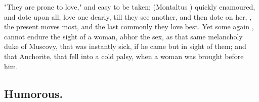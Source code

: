 {"They are prone to love," and easy to be taken;
 (Montaltus ) quickly enamoured, and dote upon all, love one dearly, till they see
another, and then dote on her, , the
present moves most, and the last commonly they love best. Yet some again
, cannot endure the sight of a woman, abhor the sex, as that same
melancholy duke of Muscovy, that was instantly sick, if he
came but in sight of them; and that Anchorite, that fell
into a cold palsy, when a woman was brought before him.

\subsection{Humorous.}

}
